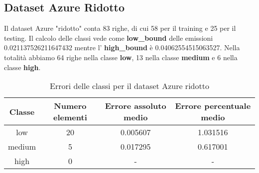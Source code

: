\subsection{Dataset Azure Ridotto}

Il dataset Azure "ridotto" conta 83 righe, di cui 58 per il training e 25 per il testing.
Il calcolo delle classi vede come \textbf{low\_bound} delle emissioni 0.021137526211647432 mentre l' \textbf{high\_bound} è 0.04062554515063527.
Nella totalità abbiamo 64 righe nella classe \textbf{low}, 13 nella classe \textbf{medium} e 6 nella classe \textbf{high}.


\begin{table}[H]
    \centering
    \begin{tabular}{|c|c|c|c|}
        \hline
        \textbf{Classe} &  \textbf{Numero elementi} & \textbf{Errore assoluto medio} & \textbf{Errore percentuale medio} \\ \hline
        low             & 20                & 0.005607                   & 1.031516            \\ \hline
        medium          & 5                & 0.017295                  & 0.617001            \\ \hline
        high            & 0                & -                   & -            \\ \hline
    \end{tabular}
    \caption{Errori delle classi per il dataset Azure ridotto}
\end{table}








